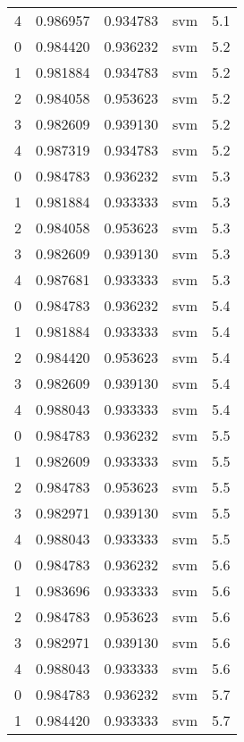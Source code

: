 \begin{tabular}{rrrlr}
     4 & 0.986957 & 0.934783 &      svm &        5.1 \\
     0 & 0.984420 & 0.936232 &      svm &        5.2 \\
     1 & 0.981884 & 0.934783 &      svm &        5.2 \\
     2 & 0.984058 & 0.953623 &      svm &        5.2 \\
     3 & 0.982609 & 0.939130 &      svm &        5.2 \\
     4 & 0.987319 & 0.934783 &      svm &        5.2 \\
     0 & 0.984783 & 0.936232 &      svm &        5.3 \\
     1 & 0.981884 & 0.933333 &      svm &        5.3 \\
     2 & 0.984058 & 0.953623 &      svm &        5.3 \\
     3 & 0.982609 & 0.939130 &      svm &        5.3 \\
     4 & 0.987681 & 0.933333 &      svm &        5.3 \\
     0 & 0.984783 & 0.936232 &      svm &        5.4 \\
     1 & 0.981884 & 0.933333 &      svm &        5.4 \\
     2 & 0.984420 & 0.953623 &      svm &        5.4 \\
     3 & 0.982609 & 0.939130 &      svm &        5.4 \\
     4 & 0.988043 & 0.933333 &      svm &        5.4 \\
     0 & 0.984783 & 0.936232 &      svm &        5.5 \\
     1 & 0.982609 & 0.933333 &      svm &        5.5 \\
     2 & 0.984783 & 0.953623 &      svm &        5.5 \\
     3 & 0.982971 & 0.939130 &      svm &        5.5 \\
     4 & 0.988043 & 0.933333 &      svm &        5.5 \\
     0 & 0.984783 & 0.936232 &      svm &        5.6 \\
     1 & 0.983696 & 0.933333 &      svm &        5.6 \\
     2 & 0.984783 & 0.953623 &      svm &        5.6 \\
     3 & 0.982971 & 0.939130 &      svm &        5.6 \\
     4 & 0.988043 & 0.933333 &      svm &        5.6 \\
     0 & 0.984783 & 0.936232 &      svm &        5.7 \\
     1 & 0.984420 & 0.933333 &      svm &        5.7 \\

\end{tabular}

